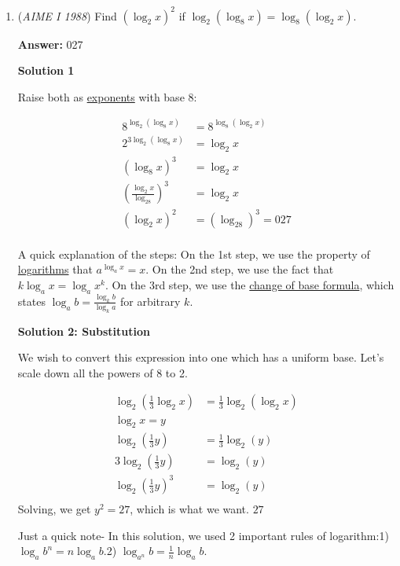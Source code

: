 \begin{enumerate}
	\item (\textit{AIME I 1988}) Find $(\log_2 x)^2$ if $\log_2 (\log_8 x) = \log_8 (\log_2 x)$.


 
 \textbf{Answer: }027



\textbf{Solution 1}

Raise both as \href{https://artofproblemsolving.com/wiki/index.php?title=Exponent}{exponents} with base 8:

 
 \begin{align*} 8^{\log_2 (\log_8 x)} &= 8^{\log_8 (\log_2 x)}\\ 2^{3 \log_2(\log_8x)} &= \log_2x\\ (\log_8x)^3 &= \log_2x\\ \left(\frac{\log_2x}{\log_28}\right)^3 &= \log_2x\\ (\log_2x)^2 &= (\log_28)^3 = \boxed{027}\\ \end{align*}


 A quick explanation of the steps: On the 1st step, we use the property of \href{https://artofproblemsolving.com/wiki/index.php?title=Logarithm}{logarithms} that $a^{\log_a x} = x$. On the 2nd step, we use the fact that $k \log_a x = \log_a x^k$. On the 3rd step, we use the \href{https://artofproblemsolving.com/wiki/index.php?title=Change\_of\_base\_formula}{change of base formula}, which states $\log_a b = \frac{\log_k b}{\log_k a}$ for arbitrary $k$.

 



\textbf{Solution 2: Substitution}

We wish to convert this expression into one which has a uniform base. Let's scale down all the powers of 8 to 2. 

 
 \begin{align*} {\log_2 (\frac{1}{3}\log_2 x)} &= \frac{1}{3}{\log_2 (\log_2 x)}\\ {\log_2 x = y}\\ {\log_2 (\frac{1}{3}y)} &= \frac{1}{3}{\log_2 (y)}\\ {3\log_2 (\frac{1}{3}y)} &= {\log_2 (y)}\\  {\log_2 (\frac{1}{3}y)^3} &= {\log_2 (y)}\\  \end{align*}
Solving, we get $y^2 = 27$, which is what we want. $\boxed{27}$

 


 Just a quick note- In this solution, we used 2 important rules of logarithm:1) $\log_a b^n=n\log_a b$.2) $\log_{a^n} b=\frac{1}{n}\log_a b$.


\end{enumerate}
